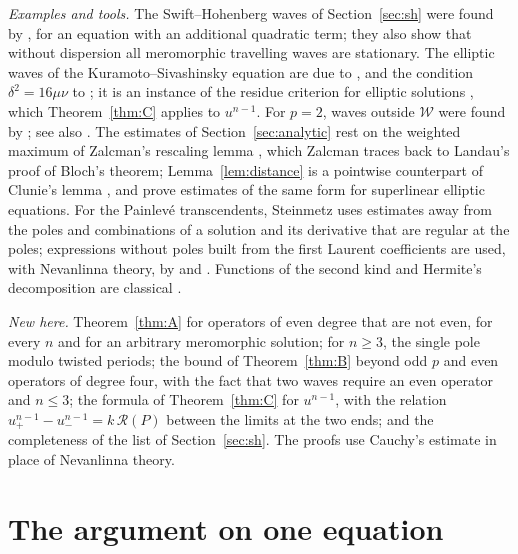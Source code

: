 \documentclass[11pt]{article}
\theoremstyle{definition}
\theoremstyle{remark}
\numberwithin{equation}{section}
\newcommand{\Wclass}{\mathcal W}
\begin{document}
\emph{Examples and tools.} The Swift--Hohenberg waves of
Section~\ref{sec:sh} were found by
\citet{KudryashovSinelshchikov2012SH}, for an equation with an
additional quadratic term; they also show that without dispersion all
meromorphic travelling waves are stationary. The elliptic waves of the
Kuramoto--Sivashinsky equation are due to \citet{Kudryashov1990}, and
the condition \(\delta^2=16\mu\nu\) to \citet{Eremenko2006}; it is an
instance of the residue criterion for elliptic solutions
\citep{Hone2005,ConteNg2010}, which Theorem~\ref{thm:C} applies to
\(u^{n-1}\). For \(p=2\), waves outside \(\Wclass\) were
found by \citet{AblowitzZeppetella1979}; see also
\citep[Lemmas~4.4 and~4.5]{ConteNgWu2015}. The estimates of
Section~\ref{sec:analytic} rest on the weighted maximum of Zalcman's
rescaling lemma \citep{Zalcman1975,Zalcman1998}, which Zalcman traces
back to Landau's proof of Bloch's theorem; Lemma~\ref{lem:distance} is
a pointwise counterpart of Clunie's lemma \citep{Laine1993}, and
\citet*{PolacikQuittnerSouplet2007} prove estimates of the same form
for superlinear elliptic equations. For the Painlev\'e transcendents,
Steinmetz \citep{Steinmetz2002,Steinmetz2017,Steinmetz2018} uses
estimates away from the poles and combinations of a solution and its
derivative that are regular at the poles; expressions without poles
built from the first Laurent coefficients are used, with Nevanlinna
theory, by \citet{HalburdWang2015} and \citet{MengHalburd2025}.
Functions of the second kind and Hermite's decomposition are classical
\citep{Hermite1885,AppellLacour1897,DeminaKudryashov2011}.

\emph{New here.} Theorem~\ref{thm:A} for operators of even degree that
are not even, for every \(n\) and for an arbitrary meromorphic
solution; for \(n\ge3\), the single pole modulo twisted periods; the
bound of Theorem~\ref{thm:B} beyond odd \(p\) and even operators of
degree four, with the fact that two waves require an even operator and
\(n\le3\); the formula of Theorem~\ref{thm:C} for \(u^{n-1}\), with the
relation \(u_+^{n-1}-u_-^{n-1}=k\,\mathcal R(P)\) between the limits at
the two ends; and the completeness of the list of Section~\ref{sec:sh}.
The proofs use Cauchy's estimate in place of Nevanlinna theory.

\section{The argument on one equation}\label{sec:example}\label{sec:strategy}
\end{document}
